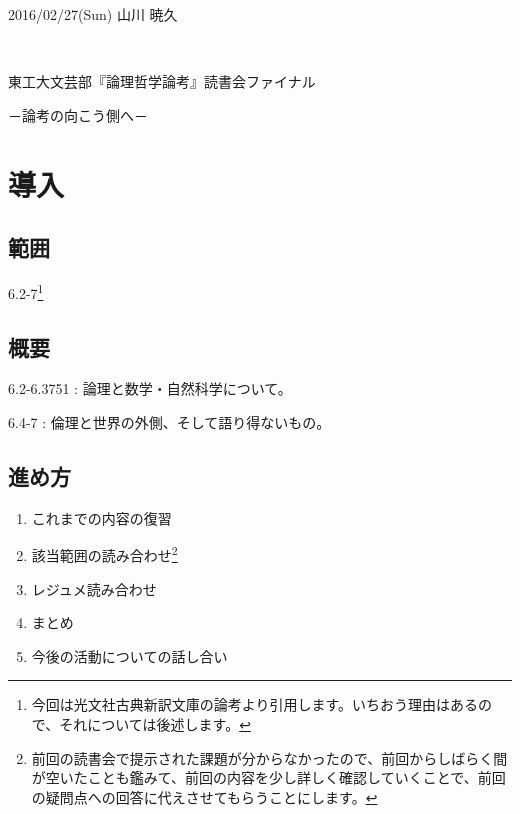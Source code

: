 \documentclass[12pt]{jsarticle}
\begin{document}
\newcommand{\bvec}[1]{\mbox{\boldmath $#1$}}
\begin{flushright}
2016/02/27(Sun) 山川 暁久
\end{flushright}　\\ 
\begin{LARGE}
東工大文芸部『論理哲学論考』読書会ファイナル
\end{LARGE}
\begin{flushright}
－論考の向こう側へ－
\end{flushright}

\section{導入}
\subsection*{範囲}
6.2-7\footnote{今回は光文社古典新訳文庫の論考より引用します。いちおう理由はあるので、それについては後述します。}\

\subsection*{概要} 
6.2-6.3751 : 論理と数学・自然科学について。\par
6.4-7 : 倫理と世界の外側、そして語り得ないもの。 

\subsection*{進め方}
\begin{enumerate}
\item これまでの内容の復習
\item 該当範囲の読み合わせ\footnote{前回の読書会で提示された課題が分からなかったので、前回からしばらく間が空いたことも鑑みて、前回の内容を少し詳しく確認していくことで、前回の疑問点への回答に代えさせてもらうことにします。}\
\item レジュメ読み合わせ
\item まとめ
\item 今後の活動についての話し合い
\end{enumerate}
\end{document}
